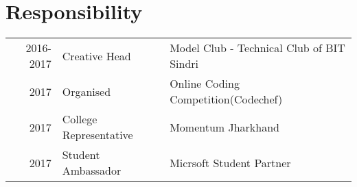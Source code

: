 \documentclass[a4paper]{deedy-resume} %
\begin{document}
\begin{minipage}[t]{0.66\textwidth}
\sectionspace %


\section{Responsibility} 

\begin{tabular}{rll}
2016-2017 & Creative Head & Model Club - Technical Club of BIT Sindri\\
2017 & Organised & Online Coding Competition(Codechef)\\
2017 & College Representative & Momentum Jharkhand\\
2017 & Student Ambassador & Micrsoft Student Partner\\
\end{tabular}

\sectionspace %


\end{minipage} %








\end{document}
